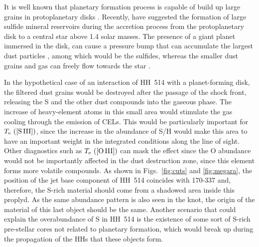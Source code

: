 \documentclass[fleqn,usenatbib]{mnras}
\begin{document}
It is well known that planetary formation process is capable of build up large grains in protoplanetary disks \citep[][]{Beckwith2000}. Recently, \citet{Kama19} have suggested the formation of large sulfide mineral reservoirs during the accretion process from the protoplanetary disk to a central star above 1.4 solar masses. The presence of a giant planet immersed in the disk, can cause a pressure bump that can accumulate the largest dust particles \citep{Pinilla2012,Birnstiel16}, among which would be the sulfides, whereas the smaller dust grains and gas can freely flow towards the star \citep[][]{Kama19}.

In the hypothetical case of an interaction of HH~514 with a planet-forming disk, the filtered dust grains would be destroyed after the passage of the shock front, releasing the S and the other dust compounds into the gaseous phase. The increase of heavy-element atoms in this small area would stimulate the gas cooling through the emission of CELs. This would be particularly important for $T_{\rm e} \text{ ([S\thinspace III])}$, since the increase in the abundance of S/H would make this area to have an important weight in the integrated conditions along the line of sight. Other diagnostics such as $T_{\rm e} \text{ ([O\thinspace III])}$ can mask the effect since the O abundance would not be importantly affected in the dust destruction zone, since this element forms more volatile compounds. 
As shown in Figs.~\ref{fig:cuts} and \ref{fig:megara}, the position of 
the jet base component of HH~514 coincides with 170-337 and, therefore, the S-rich material should come from a shadowed area inside this proplyd. As the same abundance pattern is also seen in the knot, the origin of the material of this last object should be the same. Another scenario that could explain the overabundance of S in HH~514 is the existence of some sort of S-rich pre-stellar cores not related to planetary formation, which would break up during the propagation of the HHs that these objects form.  

\end{document}
